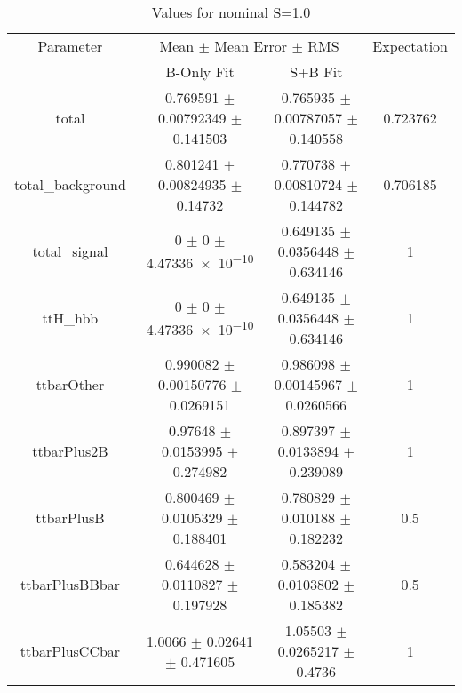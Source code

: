 \begin{table}
\centering
\caption{Values for nominal S=1.0}
\begin{tabular}{cccc}
\toprule
Parameter & \multicolumn{2}{c}{Mean $\pm$ Mean Error $\pm$ RMS} & Expectation\\
 & B-Only Fit & S+B Fit & \\
\midrule
total & \num{0.769591} $\pm$ \num{0.00792349} $\pm$ \num{0.141503} & \num{0.765935} $\pm$ \num{0.00787057} $\pm$ \num{0.140558} & \num{0.723762}\\
total\_background & \num{0.801241} $\pm$ \num{0.00824935} $\pm$ \num{0.14732} & \num{0.770738} $\pm$ \num{0.00810724} $\pm$ \num{0.144782} & \num{0.706185}\\
total\_signal & \num{0} $\pm$ \num{0} $\pm$ \num{4.47336e-10} & \num{0.649135} $\pm$ \num{0.0356448} $\pm$ \num{0.634146} & \num{1}\\
ttH\_hbb & \num{0} $\pm$ \num{0} $\pm$ \num{4.47336e-10} & \num{0.649135} $\pm$ \num{0.0356448} $\pm$ \num{0.634146} & \num{1}\\
ttbarOther & \num{0.990082} $\pm$ \num{0.00150776} $\pm$ \num{0.0269151} & \num{0.986098} $\pm$ \num{0.00145967} $\pm$ \num{0.0260566} & \num{1}\\
ttbarPlus2B & \num{0.97648} $\pm$ \num{0.0153995} $\pm$ \num{0.274982} & \num{0.897397} $\pm$ \num{0.0133894} $\pm$ \num{0.239089} & \num{1}\\
ttbarPlusB & \num{0.800469} $\pm$ \num{0.0105329} $\pm$ \num{0.188401} & \num{0.780829} $\pm$ \num{0.010188} $\pm$ \num{0.182232} & \num{0.5}\\
ttbarPlusBBbar & \num{0.644628} $\pm$ \num{0.0110827} $\pm$ \num{0.197928} & \num{0.583204} $\pm$ \num{0.0103802} $\pm$ \num{0.185382} & \num{0.5}\\
ttbarPlusCCbar & \num{1.0066} $\pm$ \num{0.02641} $\pm$ \num{0.471605} & \num{1.05503} $\pm$ \num{0.0265217} $\pm$ \num{0.4736} & \num{1}\\
\bottomrule
\end{tabular}
\end{table}